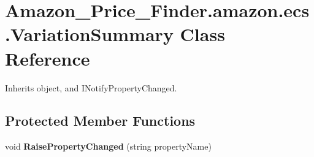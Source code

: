 \hypertarget{class_amazon___price___finder_1_1amazon_1_1ecs_1_1_variation_summary}{\section{Amazon\-\_\-\-Price\-\_\-\-Finder.\-amazon.\-ecs.\-Variation\-Summary Class Reference}
\label{class_amazon___price___finder_1_1amazon_1_1ecs_1_1_variation_summary}
}


 




Inherits object, and I\-Notify\-Property\-Changed.

\subsection*{Protected Member Functions}
\begin{DoxyCompactItemize}
\item 
\hypertarget{class_amazon___price___finder_1_1amazon_1_1ecs_1_1_variation_summary_ab8635bcf0da3f0af3ead9e25697e668b}{void {\bfseries Raise\-Property\-Changed} (string property\-Name)}\label{class_amazon___price___finder_1_1amazon_1_1ecs_1_1_variation_summary_ab8635bcf0da3f0af3ead9e25697e668b}

\end{DoxyCompactItemize}
